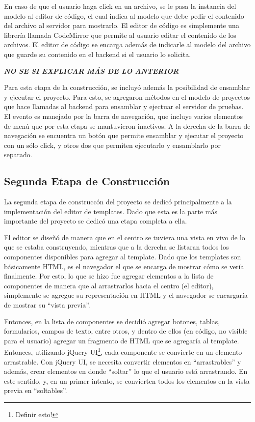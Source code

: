 \documentclass[12pt,titlepage,]{article}
\begin{document}
En caso de que el usuario haga click en un archivo, se le pasa la
instancia del modelo al editor de código, el cual indica al modelo que
debe pedir el contenido del archivo al servidor para mostrarlo. El
editor de código es simplemente una librería llamada CodeMirror que
permite al usuario editar el contenido de los archivos. El editor de
código se encarga además de indicarle al modelo del archivo que guarde
su contenido en el backend si el usuario lo solicita.

\textbf{\emph{NO SE SI EXPLICAR MÁS DE LO ANTERIOR}}

Para esta etapa de la construcción, se incluyó además la posibilidad de
ensamblar y ejecutar el proyecto. Para esto, se agregaron métodos en el
modelo de proyectos que hace llamadas al backend para ensamblar y
ejectuar el servidor de pruebas. El evento es manejado por la barra de
navegación, que incluye varios elementos de menú que por esta etapa se
mantuvieron inactivos. A la derecha de la barra de navegación se
encuentra un botón que permite ensamblar y ejecutar el proyecto con un
sólo click, y otros dos que permiten ejecutarlo y ensamblarlo por
separado.

\subsection{Segunda Etapa de Construcción}

La segunda etapa de construccón del proyecto se dedicó principalmente a
la implementación del editor de templates. Dado que esta es la parte más
importante del proyecto se dedicó una etapa completa a ella.

El editor se diseñó de manera que en el centro se tuviera una vista en
vivo de lo que se estaba construyendo, mientras que a la derecha se
listaran todos los componentes disponibles para agregar al template.
Dado que los templates son básicamente HTML, es el navegador el que se
encarga de mostrar cómo se vería finalmente. Por esto, lo que se hizo
fue agregar elementos a la lista de componentes de manera que al
arrastrarlos hacia el centro (el editor), simplemente se agregue su
representación en HTML y el navegador se encargaría de mostrar su
``vista previa''.

Entonces, en la lista de componentes se decidió agregar botones, tablas,
formularios, campos de texto, entre otros, y dentro de ellos (en código,
no visible para el usuario) agregar un fragmento de HTML que se
agregaría al template. Entonces, utilizando jQuery UI\footnote{Definir
  esto!}, cada componente se convierte en un elemento arrastrable. Con
jQuery UI, se necesita convertir elementos en ``arrastrables'' y además,
crear elementos en donde ``soltar'' lo que el usuario está arrastrando.
En este sentido, y, en un primer intento, se convierten todos los
elementos en la vista previa en ``soltables''.
\end{document}
